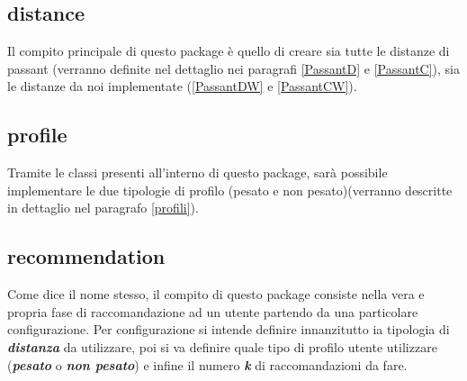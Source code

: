 \subsection{distance}
Il compito principale di questo package è quello di creare sia tutte le distanze di passant (verranno definite nel dettaglio nei paragrafi \ref{PassantD} e \ref{PassantC}), sia le distanze da noi implementate (\ref{PassantDW} e \ref{PassantCW}).

\subsection{profile}
Tramite le classi presenti all'interno di questo package, sarà possibile implementare le due tipologie di profilo (pesato e non pesato)(verranno descritte in dettaglio nel paragrafo \ref{profili}).

\subsection{recommendation}
Come dice il nome stesso, il compito di questo package consiste nella vera e propria fase di raccomandazione ad un utente partendo da una particolare configurazione. Per configurazione si intende definire innanzitutto ia tipologia di \emph{\textbf{distanza}} da utilizzare, poi si va definire quale tipo di profilo utente utilizzare (\emph{\textbf{pesato}} o \emph{\textbf{non pesato}}) e infine il numero \emph{\textbf{k}} di raccomandazioni da fare.


